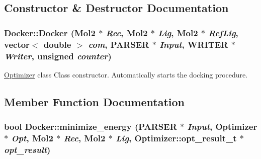 \subsection{Constructor \& Destructor Documentation}
\hypertarget{classDocker_a718b8d1bc2646f096b4e51cb8587ee56}{
\subsubsection[{Docker}]{\setlength{\rightskip}{0pt plus 5cm}Docker::Docker ({\bf Mol2} $\ast$ {\em Rec}, \/  {\bf Mol2} $\ast$ {\em Lig}, \/  {\bf Mol2} $\ast$ {\em RefLig}, \/  vector$<$ double $>$ {\em com}, \/  {\bf PARSER} $\ast$ {\em Input}, \/  {\bf WRITER} $\ast$ {\em Writer}, \/  unsigned {\em counter})}}
\label{classDocker_a718b8d1bc2646f096b4e51cb8587ee56}
\hyperlink{classOptimizer}{Optimizer} class Class constructor. Automatically starts the docking procedure. 

\subsection{Member Function Documentation}
\hypertarget{classDocker_a13bf6c4b63f4338d891210c4d6d767df}{
\subsubsection[{minimize\_\-energy}]{\setlength{\rightskip}{0pt plus 5cm}bool Docker::minimize\_\-energy ({\bf PARSER} $\ast$ {\em Input}, \/  {\bf Optimizer} $\ast$ {\em Opt}, \/  {\bf Mol2} $\ast$ {\em Rec}, \/  {\bf Mol2} $\ast$ {\em Lig}, \/  {\bf Optimizer::opt\_\-result\_\-t} $\ast$ {\em opt\_\-result})}}
\label{classDocker_a13bf6c4b63f4338d891210c4d6d767df}


